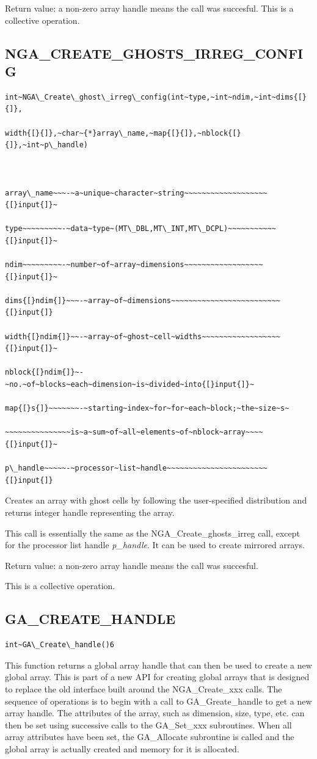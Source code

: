 Return value: a non-zero array handle means the call was succesful.
This is a collective operation.


\subsection*{\label{sub:NGA_CREATE_GHOSTS_IRREG_CONFIG}NGA\_CREATE\_GHOSTS\_IRREG\_CONFIG}
\begin{verbatim}
int~NGA\_Create\_ghost\_irreg\_config(int~type,~int~ndim,~int~dims{[}{]},

width{[}{]},~char~{*}array\_name,~map{[}{]},~nblock{[}{]},~int~p\_handle)



array\_name~~~-~a~unique~character~string~~~~~~~~~~~~~~~~~~~{[}input{]}~

type~~~~~~~~~-~data~type~(MT\_DBL,MT\_INT,MT\_DCPL)~~~~~~~~~~~{[}input{]}~

ndim~~~~~~~~~-~number~of~array~dimensions~~~~~~~~~~~~~~~~~~{[}input{]}~

dims{[}ndim{]}~~~-~array~of~dimensions~~~~~~~~~~~~~~~~~~~~~~~~~{[}input{]}

width{[}ndim{]}~~-~array~of~ghost~cell~widths~~~~~~~~~~~~~~~~~~{[}input{]}~

nblock{[}ndim{]}~-~no.~of~blocks~each~dimension~is~divided~into{[}input{]}~

map{[}s{]}~~~~~~~-~starting~index~for~for~each~block;~the~size~s~

~~~~~~~~~~~~~~~is~a~sum~of~all~elements~of~nblock~array~~~~{[}input{]}~

p\_handle~~~~~-~processor~list~handle~~~~~~~~~~~~~~~~~~~~~~~{[}input{]}
\end{verbatim}
Creates an array with ghost cells by following the user-specified
distribution and returns integer handle representing the array.

This call is essentially the same as the NGA\_Create\_ghosts\_irreg
call, except for the processor list handle \emph{p\_handle}. It can
be used to create mirrored arrays.

Return value: a non-zero array handle means the call was succesful.

This is a collective operation. 


\subsection*{\label{sub:GA_CREATE_HANDLE}GA\_CREATE\_HANDLE}
\begin{verbatim}
int~GA\_Create\_handle()6
\end{verbatim}
This function returns a global array handle that can then be used
to create a new global array. This is part of a new API for creating
global arrays that is designed to replace the old interface built
around the NGA\_Create\_xxx calls. The sequence of operations is to
begin with a call to GA\_Greate\_handle to get a new array handle.
The attributes of the array, such as dimension, size, type, etc. can
then be set using successive calls to the GA\_Set\_xxx subroutines.
When all array attributes have been set, the GA\_Allocate subroutine
is called and the global array is actually created and memory for
it is allocated.

